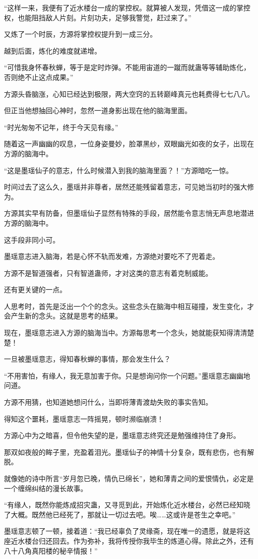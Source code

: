 \begin{this_body}
“这样一来，我便有了近水楼台一成的掌控权。就算被人发现，凭借这一成的掌控权，也能阻挡敌人片刻。片刻功夫，足够我警觉，赶过来了。”

又炼了一个时辰，方源将掌控权提升到一成三分。

越到后面，炼化的难度就递增。

“可惜我身怀春秋蝉，等于是定时炸弹。不能用宙道的一蹴而就蛊等等辅助炼化，否则绝不止这点成果。”

方源头昏脑涨，心知已经达到极限，两大空窍的五转巅峰真元也耗费得七七八八。

但正当他想抽回心神时，忽然一道身影出现在他的脑海里面。

“时光匆匆不记年，终于今天见有缘。”

随着这一声幽幽的叹息，一位身姿曼妙，脸罩黑纱，双眼幽光如夜的女子，出现在方源的脑海中。

“这是墨瑶仙子的意志，什么时候潜入到我的脑海里面？！”方源暗吃一惊。

时间过去了这么久，墨瑶并非尊者，居然还能残留着意志，可见她当初时的强大修为。

方源其实早有防备，但墨瑶仙子显然有特殊的手段，居然能令意志悄无声息地潜进方源的脑海中。

这手段非同小可。

墨瑶意志进入脑海，若是心怀不轨而发难，方源绝对要吃不了兜着走。

方源不是智道强者，只有智道蛊师，才对这类的意志有着克制威能。

还有更关键的一点。

人思考时，首先是泛出一个个的念头。这些念头在脑海中相互碰撞，发生变化，才会产生新的念头。这就是思考的结果。

现在，墨瑶意志进入方源的脑海当中。方源每思考一个念头，她就能获知得清清楚楚！

一旦被墨瑶意志，得知春秋蝉的事情，那会发生什么？

“不用害怕，有缘人，我无意加害于你。只是想询问你一个问题。”墨瑶意志幽幽地问道。

方源不用猜，也知道她想问什么，当即将薄青渡劫失败的事实告知。

得知这个噩耗，墨瑶意志一阵摇晃，顿时濒临崩溃！

方源心中为之暗喜，但令他失望的是，墨瑶意志终究还是勉强维持住了身形。

那双如夜般的眸子里，充盈着泪光。墨瑶仙子的神情十分复杂，既有悲伤，也有解脱。

就像她的诗中所言“岁月忽已晚，情仇已绵长”，她和薄青之间的爱恨情仇，必定是一个缠绵纠结的漫长故事。

“有缘人，既然你能炼成招灾蛊，又寻觅到此，开始炼化近水楼台，必然已经知晓了大概。既然他已经死了，那就让一切过去吧。唉……这或许是苍生之幸吧。”

墨瑶意志顿了一顿，接着道：“我已经辜负了灵缘斋，现在唯一的遗愿，就是将这座近水楼台归还回去。作为弥补，我将传授你我毕生的炼道心得。除此之外，还有八十八角真阳楼的秘辛情报！”

\end{this_body}

